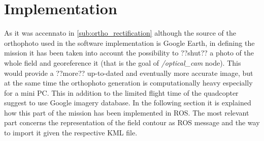 \section{Implementation} %
\label{sec:implementation}
As it was accennato in \ref{sub:ortho_rectification} although the source of the orthophoto used in the software implementation is Google Earth, in defining the mission it has been taken into account the possibility to ??shut?? a photo of the whole field and georeference it (that is the goal of \textit{/optical\_cam} node). This would provide a ??more?? up-to-dated and eventually more accurate image, but at the same time the orthophoto generation is computationally heavy especially for a mini PC. This in addition to the limited flight time of the quadcopter suggest to use Google imagery database.
In the following section it is explained how this part of the mission has been implemented in ROS. The most relevant part concerns the representation of the field contour as ROS message and the way to import it given the respective KML file.

